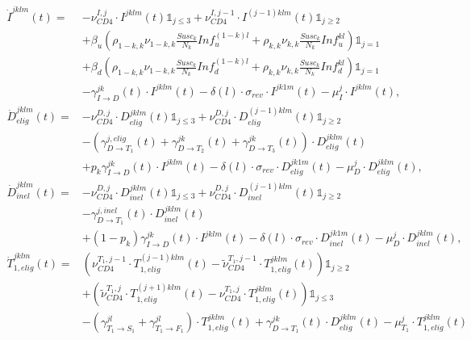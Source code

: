\documentclass{article}
\begin{document}
\begin{align*}\label{ode}
  \dot{I}^{jklm}(t) =&-\nu_{CD4}^{I,j}\cdot I^{jklm}(t)\mathbb{1}_{j\leq 3}+\nu_{CD4}^{I,j-1}\cdot I^{(j-1)klm}(t)\mathbb{1}_{j\geq 2}\\[16pt]
  &+\beta_u \left( \rho_{1-k,k}\nu_{1-k,k}\frac{Susc_k}{N_k}Inf_u^{(1-k)l}+\rho_{k,k}\nu_{k,k}\frac{Susc_k}{N_k}Inf_u^{kl}\right)\mathbb{1}_{j=1}\\[16pt]
  &+\beta_d \left( \rho_{1-k,k}\nu_{1-k,k}\frac{Susc_k}{N_k}Inf_d^{(1-k)l}+\rho_{k,k}\nu_{k,k}\frac{Susc_k}{N_k}Inf_d^{kl}\right)\mathbb{1}_{j=1}\\
  &-\gamma^{jk}_{I\rightarrow D}(t)\cdot I^{jklm}(t)-\delta(l)\cdot\sigma_{rev}\cdot I^{jk1m}(t)-\mu_{I}^{j}\cdot I^{jklm}(t),\\[16pt] 
  \dot{D}_{elig}^{jklm}(t) =& -\nu_{CD4}^{D,j}\cdot D_{elig}^{jklm}(t)\mathbb{1}_{j\leq 3}+\nu_{CD4}^{D,j}\cdot D_{elig}^{(j-1)klm}(t)\mathbb{1}_{j\geq 2}\\
  & -(\gamma^{j,elig}_{D\rightarrow T_1}(t)+\gamma^{jk}_{D\rightarrow T_2}(t)+\gamma^{jk}_{D\rightarrow T_3}(t))\cdot D_{elig}^{jklm}(t)\\
  &+p_k\gamma^{jk}_{I\rightarrow D}(t)\cdot I^{jklm}(t)
  -\delta(l)\cdot\sigma_{rev}\cdot D_{elig}^{jk1m}(t)-\mu_{D}^{j}\cdot D_{elig}^{jklm}(t),\\[16pt]
  \dot{D}_{inel}^{jklm}(t) =& -\nu_{CD4}^{D,j}\cdot D_{inel}^{jklm}(t)\mathbb{1}_{j\leq 3}+\nu_{CD4}^{D,j}\cdot D_{inel}^{(j-1)klm}(t)\mathbb{1}_{j\geq 2}\\
  &-\gamma^{j,inel}_{D\rightarrow T_1}(t)\cdot D_{inel}^{jklm}(t)\\
  &+(1-p_k)\gamma^{jk}_{I\rightarrow D}(t)\cdot I^{jklm}(t)
  -\delta(l)\cdot\sigma_{rev}\cdot D_{inel}^{jk1m}(t)-\mu_{D}^{j}\cdot D_{inel}^{jklm}(t),\\[16pt]
  \dot{T}_{1,elig}^{jklm}(t) =& \left(\nu_{CD4}^{T_1,j-1}\cdot T_{1,elig}^{(j-1)klm}(t)-\tilde{\nu}_{CD4}^{T_1,j-1}\cdot T_{1,elig}^{jklm}(t)\right)\mathbb{1}_{j\geq 2}\\
  &+\left(\tilde{\nu}_{CD4}^{T_1,j}\cdot T_{1,elig}^{(j+1)klm}(t)-\nu_{CD4}^{T_1,j}\cdot T_{1,elig}^{jklm}(t) \right)\mathbb{1}_{j\leq 3}\\
  &-(\gamma^{jl}_{T_1\rightarrow S_1}+\gamma^{jl}_{T_1\rightarrow F_1})\cdot T_{1,elig}^{jklm}(t)+\gamma^{jk}_{D\rightarrow T_1}(t)\cdot D_{elig}^{jklm}(t)-\mu_{T_1}^{j}\cdot T_{1,elig}^{jklm}(t)\\[16pt]

\end{align*}
\end{document}
